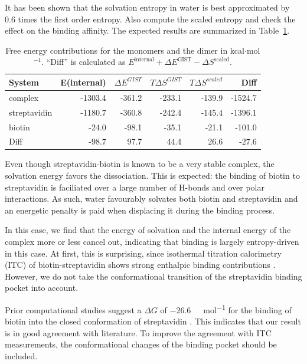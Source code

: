 \documentclass[9pt,tutorial]{livecoms}
\begin{document}
It has been shown \cite{Chen2021,Waibl2022-gist-solvents} that the solvation entropy in water is best approximated by 0.6 times the first order entropy.
Also compute the scaled entropy and check the effect on the binding affinity.
The expected results are summarized in Table~\ref{tab_dg_monomers_dimer}.


\begin{table}[h]
	\caption{Free energy contributions for the monomers and the dimer in kcal$\cdot$mol$^{-1}$. ``Diff'' is calculated as $E^\text{internal} + \Delta E^\text{GIST} - \Delta S^\text{scaled}$.}\label{tab_dg_monomers_dimer}
	\small
	\begin{tabular}{@{}lrrrrr@{}}
		\toprule
		System       & E(internal) & $\Delta E^\textit{GIST}$ & $T\Delta S^\textit{GIST}$ & $T\Delta S^\textit{scaled}$ & Diff \\
		\midrule
		complex      & -1303.4 & -361.2 & -233.1 & -139.9 & -1524.7 \\
		streptavidin & -1180.7 & -360.8 & -242.4 & -145.4 & -1396.1 \\
		biotin       & -24.0   &  -98.1 &  -35.1 &  -21.1 &  -101.0 \\
		Diff         & -98.7   &   97.7 &   44.4 &   26.6 &   -27.6 \\
		\bottomrule
	\end{tabular}
\end{table}

Even though streptavidin-biotin is known to be a very stable complex, the solvation energy favors the dissociation.
This is expected: the binding of biotin to streptavidin is faciliated over a large number of H-bonds and over polar interactions. As such, water favourably solvates both biotin and streptavidin and an energetic penalty is paid when displacing it during the binding process. 

In this case, we find that the energy of solvation and the internal energy of the complex more or less cancel out, indicating that binding is largely entropy-driven in this case.
At first, this is surprising, since isothermal titration calorimetry (ITC) of biotin-streptavidin shows strong enthalpic binding contributions \cite{mpye2020-biotin-itc,hyre2006-biotin-itc}.
However, we do not take the conformational transition of the streptavidin binding pocket into account.

Prior computational studies suggest a $\Delta G$ of \SI{-26.6}{\kilo\calorie\per\mole} for the binding of biotin into the closed conformation of streptavidin \cite{Bansal2018-biotin}.
This indicates that our result is in good agreement with literature.
To improve the agreement with ITC measurements, the conformational changes of the binding pocket should be included.
\end{document}
